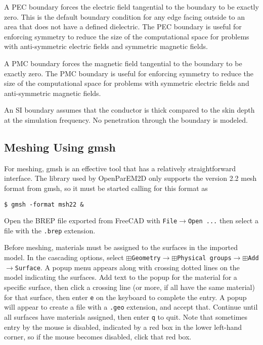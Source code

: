 \documentclass[titlepage]{article}
\renewcommand\_{\textunderscore\linebreak[1]}
\begin{document}
A PEC boundary forces the electric field tangential to the boundary to be exactly zero.  This is the default boundary condition for any edge facing outside to an area that does not have a defined dielectric.
 The PEC boundary is useful for enforcing symmetry to reduce the size of the computational space for problems with anti-symmetric electric fields and symmetric magnetic fields.

A PMC boundary forces the magnetic field tangential to the boundary to be exactly zero.  The PMC boundary is useful for enforcing symmetry to reduce the size of the computational space for problems with symmetric electric fields and anti-symmetric magnetic fields.

An SI boundary assumes that the conductor is thick compared to the skin depth at the simulation frequency.  No penetration through the boundary is modeled.

\subsection{Meshing Using gmsh}
\label{sec:gmsh}

For meshing, gmsh is an effective tool that has a relatively straightforward interface.  The library used by OpenParEM2D only supports the version 2.2 mesh format from gmsh, so it must be started calling for this format as
\begin{Verbatim}[fontsize=\small]
   $ gmsh -format msh22 &
\end{Verbatim}
\noindent Open the BREP file exported from FreeCAD with \texttt{File}$\rightarrow$\texttt{Open ...} then select a file with the \texttt{.brep} extension.

Before meshing, materials must be assigned to the surfaces in the imported model.  In the cascading options, select $\boxplus$\texttt{Geometry}$\rightarrow$$\boxplus$\texttt{Physical groups}$\rightarrow$$\boxplus$\texttt{Add}$\rightarrow$\texttt{Surface}.  A popup menu appears along with crossing dotted lines on the model indicating the surfaces.  Add text to the popup for the material for a specific surface, then click a crossing line (or more, if all have the same material) for that surface, then enter \texttt{e} on the keyboard to complete the entry.  A popup will appear to create a file with a \texttt{.geo} extension, and accept that.  Continue until all surfaces have materials assigned, then enter \texttt{q} to quit.  Note that sometimes entry by the mouse is disabled, indicated by a red box in the lower left-hand corner, so if the mouse becomes disabled, click that red box.
\end{document}

